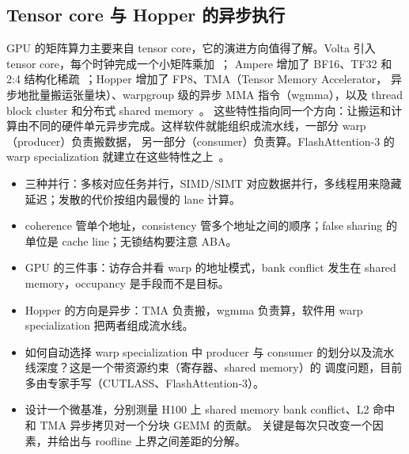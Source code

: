 \subsection{Tensor core 与 Hopper 的异步执行}

GPU 的矩阵算力主要来自 tensor core，它的演进方向值得了解。Volta 引入 tensor core，每个时钟完成一个小矩阵乘加~\cite{nvidiavolta2017}；
Ampere 增加了 BF16、TF32 和 2:4 结构化稀疏~\cite{nvidiaa100,mishra2021accelerating}；Hopper 增加了 FP8、TMA（Tensor Memory Accelerator，
异步地批量搬运张量块）、warpgroup 级的异步 MMA 指令（wgmma），以及 thread block cluster 和分布式 shared memory~\cite{nvidiah100}。
这些特性指向同一个方向：让搬运和计算由不同的硬件单元异步完成。这样软件就能组织成流水线，一部分 warp（producer）负责搬数据，
另一部分（consumer）负责算。FlashAttention-3 的 warp specialization 就建立在这些特性之上~\cite{shah2024flashattention3}。

\begin{keypts}
\begin{itemize}
\item 三种并行：多核对应任务并行，SIMD/SIMT 对应数据并行，多线程用来隐藏延迟；发散的代价按组内最慢的 lane 计算。
\item coherence 管单个地址，consistency 管多个地址之间的顺序；false sharing 的单位是 cache line；无锁结构要注意 ABA。
\item GPU 的三件事：访存合并看 warp 的地址模式，bank conflict 发生在 shared memory，occupancy 是手段而不是目标。
\item Hopper 的方向是异步：TMA 负责搬，wgmma 负责算，软件用 warp specialization 把两者组成流水线。
\end{itemize}
\end{keypts}

\begin{research}
\begin{itemize}
\item 如何自动选择 warp specialization 中 producer 与 consumer 的划分以及流水线深度？这是一个带资源约束（寄存器、shared memory）的
调度问题，目前多由专家手写（CUTLASS、FlashAttention-3）。
\item 设计一个微基准，分别测量 H100 上 shared memory bank conflict、L2 命中和 TMA 异步拷贝对一个分块 GEMM 的贡献。
关键是每次只改变一个因素，并给出与 roofline 上界之间差距的分解。
\end{itemize}
\end{research}

